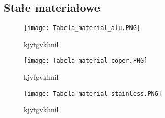 \subsection{Stałe materiałowe}
    \begin{figure}[!ht]
        \centering
        \texttt{[image: Tabela\_material\_alu.PNG]}
        \caption{kjyfgvkhnil}

        \texttt{[image: Tabela\_material\_coper.PNG]}
        \caption{kjyfgvkhnil}
        \centering
        \texttt{[image: Tabela\_material\_stainless.PNG]}
        \caption{kjyfgvkhnil}
    \end{figure}
\pagebreak     